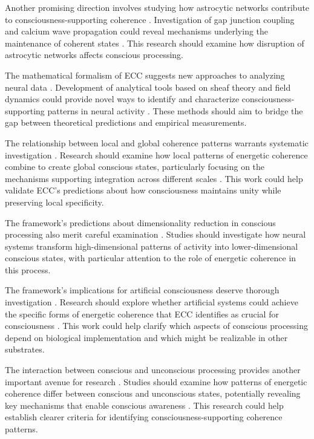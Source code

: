 \begin{refsection}
Another promising direction involves studying how astrocytic networks contribute to consciousness-supporting coherence \cite{rosen2012anticipatory}. Investigation of gap junction coupling and calcium wave propagation could reveal mechanisms underlying the maintenance of coherent states \cite{thompson2014waking}. This research should examine how disruption of astrocytic networks affects conscious processing.

The mathematical formalism of ECC suggests new approaches to analyzing neural data \cite{langer2009philosophy}. Development of analytical tools based on sheaf theory and field dynamics could provide novel ways to identify and characterize consciousness-supporting patterns in neural activity \cite{varela2016embodied}. These methods should aim to bridge the gap between theoretical predictions and empirical measurements.

The relationship between local and global coherence patterns warrants systematic investigation \cite{feinberg2016ancient}. Research should examine how local patterns of energetic coherence combine to create global conscious states, particularly focusing on the mechanisms supporting integration across different scales \cite{zahavi2014self}. This work could help validate ECC's predictions about how consciousness maintains unity while preserving local specificity.

The framework's predictions about dimensionality reduction in conscious processing also merit careful examination \cite{merleau2012phenomenology}. Studies should investigate how neural systems transform high-dimensional patterns of activity into lower-dimensional conscious states, with particular attention to the role of energetic coherence in this process.

The framework's implications for artificial consciousness deserve thorough investigation \cite{pigliucci2013philosophy}. Research should explore whether artificial systems could achieve the specific forms of energetic coherence that ECC identifies as crucial for consciousness \cite{block2009comparing}. This work could help clarify which aspects of conscious processing depend on biological implementation and which might be realizable in other substrates.

The interaction between conscious and unconscious processing provides another important avenue for research \cite{noe2009out}. Studies should examine how patterns of energetic coherence differ between conscious and unconscious states, potentially revealing key mechanisms that enable conscious awareness \cite{koch2019feeling}. This research could help establish clearer criteria for identifying consciousness-supporting coherence patterns.


\end{refsection}
